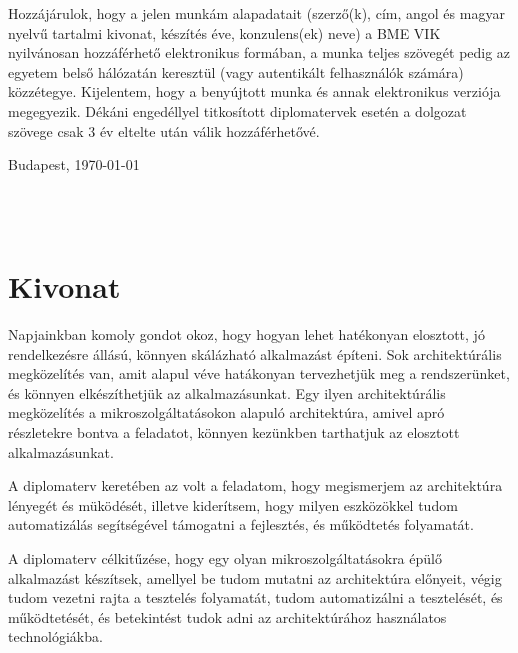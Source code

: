 \documentclass[11pt,magyar,a4paper,twoside,]{report}
\begin{document}
Hozzájárulok, hogy a jelen munkám alapadatait (szerző(k), cím, angol és magyar nyelvű tartalmi kivonat, készítés éve, konzulens(ek) neve) a BME VIK nyilvánosan hozzáférhető elektronikus formában, a munka teljes szövegét pedig az egyetem belső hálózatán keresztül (vagy autentikált felhasználók számára) közzétegye. Kijelentem, hogy a benyújtott munka és annak elektronikus verziója megegyezik. Dékáni engedéllyel titkosított diplomatervek esetén a dolgozat szövege csak 3 év eltelte után válik hozzáférhetővé.

\begin{flushleft}
\vspace*{1cm}
Budapest, \today
\end{flushleft}

\begin{flushright}
 \vspace*{1cm}
 \makebox[7cm]{\rule{6cm}{.4pt}}\\
 \\
\end{flushright}
\thispagestyle{empty}

\vfill
\clearpage
\thispagestyle{empty} %

\chapter*{Kivonat}\label{kivonat}

Napjainkban komoly gondot okoz, hogy hogyan lehet hatékonyan elosztott,
jó rendelkezésre állású, könnyen skálázható alkalmazást építeni. Sok
architektúrális megközelítés van, amit alapul véve hatákonyan
tervezhetjük meg a rendszerünket, és könnyen elkészíthetjük az
alkalmazásunkat. Egy ilyen architektúrális megközelítés a
mikroszolgáltatásokon alapuló architektúra, amivel apró részletekre
bontva a feladatot, könnyen kezünkben tarthatjuk az elosztott
alkalmazásunkat.

A diplomaterv keretében az volt a feladatom, hogy megismerjem az
architektúra lényegét és müködését, illetve kiderítsem, hogy milyen
eszközökkel tudom automatizálás segítségével támogatni a fejlesztés, és
működtetés folyamatát.

A diplomaterv célkitűzése, hogy egy olyan mikroszolgáltatásokra épülő
alkalmazást készítsek, amellyel be tudom mutatni az architektúra
előnyeit, végig tudom vezetni rajta a tesztelés folyamatát, tudom
automatizálni a tesztelését, és működtetését, és betekintést tudok adni
az architektúrához használatos technológiákba.
\end{document}
